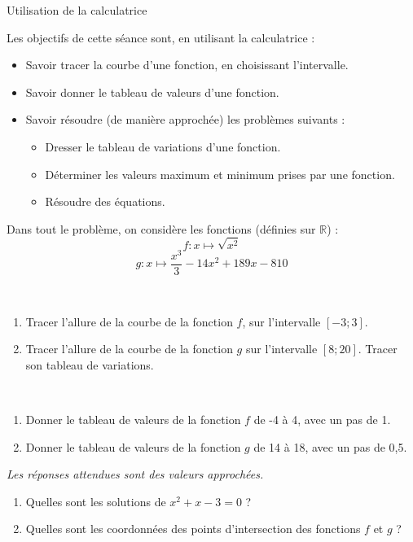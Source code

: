 \documentclass[12pt]{article}
\begin{document}
\begin{center}
  \Large Utilisation de la calculatrice
\end{center}

Les objectifs de cette séance sont, en utilisant la calculatrice :
\begin{itemize}
  \item Savoir tracer la courbe d'une fonction, en choisissant l'intervalle.
  \item Savoir donner le tableau de valeurs d'une fonction.
  \item Savoir résoudre (de manière approchée) les problèmes suivants :
    \begin{itemize}
      \item Dresser le tableau de variations d'une fonction.
      \item Déterminer les valeurs maximum et minimum prises par une fonction.
      \item Résoudre des équations.
    \end{itemize}
\end{itemize}

Dans tout le problème, on considère les fonctions (définies sur $\mathbb{R}$) :
\[f:x\mapsto \sqrt{x^2}\]
\[g:x\mapsto \frac{x^3}{3}-14x^2+189x-810\]

\begin{exercice}~
  \begin{enumerate}
    \item Tracer l'allure de la courbe de la fonction $f$, sur l'intervalle $\left[ -3;3 \right]$.
    \item Tracer l'allure de la courbe de la fonction $g$ sur l'intervalle $\left[ 8; 20 \right]$. Tracer son tableau de variations.
  \end{enumerate}
\end{exercice}

\begin{exercice}~
  \begin{enumerate}
    \item Donner le tableau de valeurs de la fonction $f$ de -4 à 4, avec un pas de 1.
    \item Donner le tableau de valeurs de la fonction $g$ de 14 à 18, avec un pas de 0,5.
  \end{enumerate}
\end{exercice}

\begin{exercice}
  \emph{Les réponses attendues sont des valeurs approchées.}
  \begin{enumerate}
    \item Quelles sont les solutions de $x^2+x-3=0$ ?
    \item Quelles sont les coordonnées des points d'intersection des fonctions $f$ et $g$ ?
  \end{enumerate}
\end{exercice}
\end{document}
